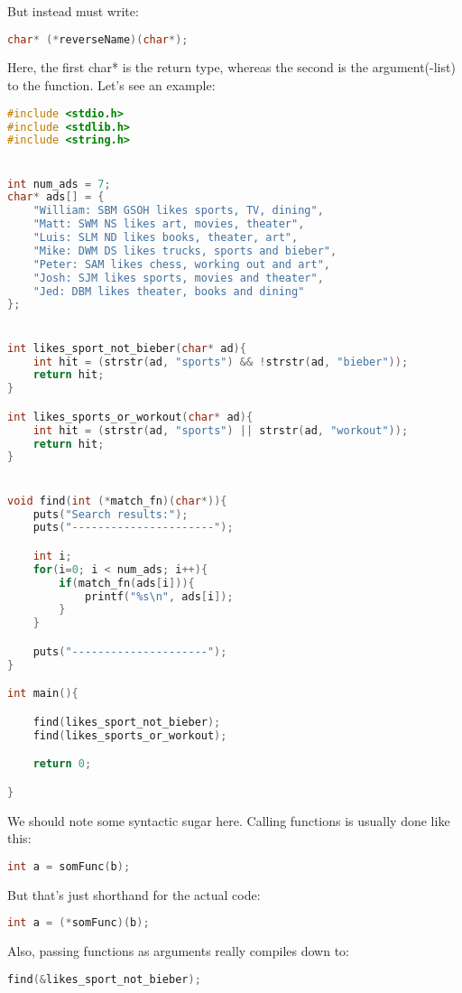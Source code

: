 But instead must write:
\begin{lstlisting}[language=c]
char* (*reverseName)(char*);
\end{lstlisting}
Here, the first char* is the return type, whereas the second is the argument(-list) to the function. Let's see an example:


\begin{lstlisting}[language=c]
#include <stdio.h>
#include <stdlib.h>
#include <string.h>


int num_ads = 7;
char* ads[] = {
	"William: SBM GSOH likes sports, TV, dining",
	"Matt: SWM NS likes art, movies, theater",
	"Luis: SLM ND likes books, theater, art",
	"Mike: DWM DS likes trucks, sports and bieber",
	"Peter: SAM likes chess, working out and art",
	"Josh: SJM likes sports, movies and theater",
	"Jed: DBM likes theater, books and dining"
};


int likes_sport_not_bieber(char* ad){
	int hit = (strstr(ad, "sports") && !strstr(ad, "bieber"));
	return hit;
}

int likes_sports_or_workout(char* ad){
	int hit = (strstr(ad, "sports") || strstr(ad, "workout"));
	return hit;
}


void find(int (*match_fn)(char*)){
	puts("Search results:");
	puts("----------------------");

	int i;
	for(i=0; i < num_ads; i++){
		if(match_fn(ads[i])){
			printf("%s\n", ads[i]);
		}
	}

	puts("---------------------");
}

int main(){

	find(likes_sport_not_bieber);
	find(likes_sports_or_workout);

	return 0;

}

\end{lstlisting}


We should note some syntactic sugar here. 
Calling functions is usually done like this:
\begin{lstlisting}[language=c]
int a = somFunc(b);
\end{lstlisting}
But that's just shorthand for the actual code:
\begin{lstlisting}[language=c]
int a = (*somFunc)(b);
\end{lstlisting}

Also, passing functions as arguments really compiles down to:
\begin{lstlisting}[language=c]
find(&likes_sport_not_bieber);
\end{lstlisting}



